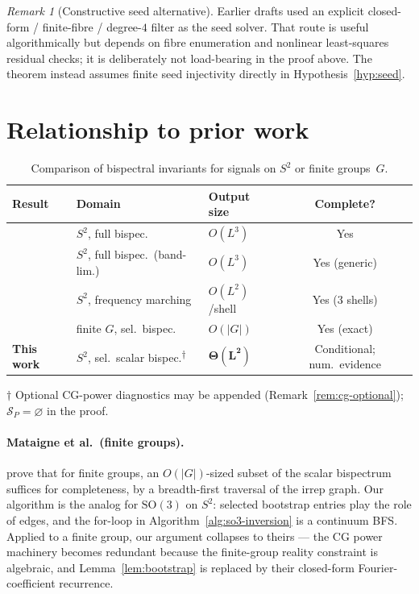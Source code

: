 \documentclass[11pt]{article}
\theoremstyle{plain}
\theoremstyle{definition}
\theoremstyle{remark}
\newtheorem{remark}[theorem]{Remark}
\newcommand{\SO}{\mathrm{SO}}
\newcommand{\abs}[1]{\lvert #1 \rvert}
\newcommand{\SP}{\mathcal{S}_P}
\begin{document}
\begin{remark}[Constructive seed alternative]
Earlier drafts used an explicit closed-form / finite-fibre /
degree-$4$ filter as the seed solver. That route is useful
algorithmically but depends on fibre enumeration and nonlinear
least-squares residual checks; it is deliberately not load-bearing in
the proof above. The theorem instead assumes finite seed injectivity
directly in Hypothesis~\ref{hyp:seed}.
\end{remark}

\section{Relationship to prior work}
\label{sec:related}

\begin{table}[h]
  \caption{Comparison of bispectral invariants for signals on $S^2$ or
    finite groups~$G$.}
  \label{tab:comparison}
  \centering
  \small
  \setlength{\tabcolsep}{4pt}
  \begin{tabular}{@{}lllc@{}}
    \toprule
    Result & Domain & Output size & Complete? \\
    \midrule
    \citet{kakarala2012bispectrum}
      & $S^2$, full bispec. & $O(L^3)$ & Yes \\
    \citet{edidin2024orbit}
      & $S^2$, full bispec.\ (band-lim.) & $O(L^3)$ & Yes (generic) \\
    \citet{bendory2025orbit}
      & $S^2$, frequency marching & $O(L^2)$/shell & Yes (3 shells) \\
    \citet{mataigne2024selective}
      & finite $G$, sel.\ bispec. & $O(\abs{G})$ & Yes (exact) \\
    \textbf{This work}
      & \boldmath$S^2$, sel.\ scalar bispec.\textsuperscript{$\dagger$}
      & $\boldsymbol{\Theta(L^2)}$ & Conditional; num.\ evidence \\
    \bottomrule
  \end{tabular}
  \par\smallskip
  {\footnotesize $\dagger$ Optional CG-power diagnostics may be
  appended (Remark~\ref{rem:cg-optional}); $\SP=\varnothing$ in the
  proof.}
\end{table}

\paragraph{Mataigne et al.\ (finite groups).}
\citet{mataigne2024selective} prove that for finite groups, an
$O(\abs{G})$-sized subset of the scalar bispectrum suffices for
completeness, by a breadth-first traversal of the irrep graph. Our
algorithm is the analog for $\SO(3)$ on $S^2$: selected bootstrap entries play the
role of edges, and the for-loop in
Algorithm~\ref{alg:so3-inversion} is a continuum BFS. Applied to a
finite group, our argument collapses to theirs --- the CG power
machinery becomes redundant because the finite-group reality
constraint is algebraic, and Lemma~\ref{lem:bootstrap} is replaced by
their closed-form Fourier-coefficient recurrence.
\end{document}
